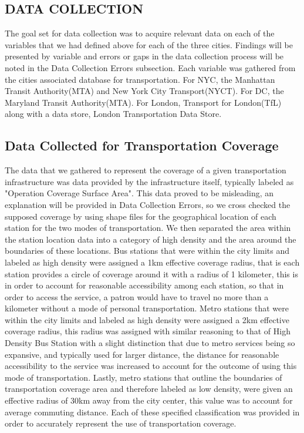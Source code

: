 \documentclass[12pt]{article}
\begin{document}
\begin{multicols}{2}
\section{DATA COLLECTION}
The goal set for data collection was to acquire relevant data on each of the variables that we had defined above for each of the three cities. Findings will be presented by variable and errors or gaps in the data collection process will be noted in the Data Collection Errors subsection. Each variable was gathered from the cities associated database for transportation. For NYC, the Manhattan Transit Authority(MTA) and New York City Transport(NYCT). For DC, the Maryland Transit Authority(MTA). For London, Transport for London(TfL) along with a data store, London Transportation Data Store.

\subsection{Data Collected for Transportation Coverage}
The data that we gathered to represent the coverage of a given transportation infrastructure was data provided by the infrastructure itself, typically labeled as "Operation Coverage Surface Area". This data proved to be misleading, an explanation will be provided in Data Collection Errors, so we cross checked the supposed coverage by using shape files for the geographical location of each station for the two modes of transportation. We then separated the area within the station location data into a category of high density and the area around the boundaries of these locations. Bus stations that were within the city limits and labeled as high density were assigned a 1km effective coverage radius, that is each station provides a circle of coverage around it with a radius of 1 kilometer, this is in order to account for reasonable accessibility among each station, so that in order to access the service, a patron would have to travel no more than a kilometer without a mode of personal transportation. Metro stations that were within the city limits and labeled as high density were assigned a 2km effective coverage radius, this radius was assigned with similar reasoning to that of High Density Bus Station with a slight distinction that due to metro services being so expansive, and typically used for larger distance, the distance for reasonable accessibility to the service was increased to account for the outcome of using this mode of transportation. Lastly, metro stations that outline the boundaries of transportation coverage area and therefore labeled as low density, were given an effective radius of 30km away from the city center, this value was to account for average commuting distance. Each of these specified classification was provided in order to accurately represent the use of transportation coverage.


\end{multicols}
\end{document}
